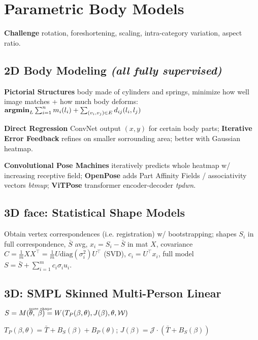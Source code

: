 \section{Parametric Body Models}
\textbf{Challenge} rotation, foreshortening, scaling, intra-category variation, aspect ratio.

\subsection*{2D Body Modeling \textnormal{\textit{(all fully supervised)}}}

\textbf{Pictorial Structures} body made of cylinders and springs, minimize how well image matches + how much body deforms: \( \operatorname{\textbf{argmin}}_L \sum_{i=1}^{n}m_i(l_i) + \sum_{(v_i,v_j)\in E} d_{ij}(l_i,l_j) \)

\textbf{Direct Regression} ConvNet output \((x,y)\) for certain body parts; \textbf{Iterative Error Feedback} refines on smaller sorrounding area; better with Gaussian heatmap.

\textbf{Convolutional Pose Machines} iteratively predicts whole heatmap w/ increasing receptive field; \textbf{OpenPose} adds Part Affinity Fields / associativity vectors \textit{btmup}; \textbf{ViTPose} transformer encoder-decoder \textit{tpdwn}.

\subsection*{3D face: Statistical Shape Models}

Obtain vertex correspondences (i.e. registration) w/ bootstrapping; shapes $S_i$ in full correspondence, $\bar{S}$ avg, $x_i=S_i-\bar{S}$ in mat $X$, covariance $C=\frac{1}{m}X X^\intercal=\frac{1}{m}U \text{diag}(\sigma_i^2)U^\intercal$ (SVD), $c_i = U^\intercal x_i$, full model \( S = \bar{S} + \sum_{i=1}^{m} c_i \sigma_i u_i\).

\subsection*{3D: SMPL Skinned Multi-Person Linear}

\(S=M(\makebox[0pt][l]{\smash{\text{\raisebox{0.75em}{\tiny{pose shape}}}}}\theta, \;\beta)
=W(T_P(\beta, \theta), J(\beta), \theta, \mathcal{W})\)

\(T_P(\beta, \!\theta) \!\!=\!\! \bar{T} \!\!+\!\! B_S(\beta) \!\!+\!\! B_P(\theta)\); \(J(\beta) \!\!=\!\! \mathcal{J}\!\!\cdot\!(\bar{T} \!\!+\!\! B_S(\beta))\)

